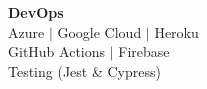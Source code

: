 \textbf{DevOps} \\
\midrule
Azure $|$ Google Cloud $|$ Heroku \\
GitHub Actions $|$ Firebase \\
Testing (Jest \& Cypress) 
